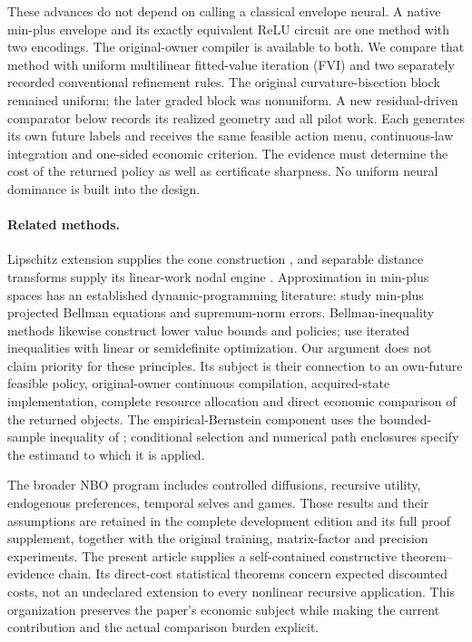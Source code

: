 \documentclass[ecta,nameyear,draft]{econsocart}
\begin{document}
These advances do not depend on calling a classical envelope neural. A native min-plus envelope and its exactly equivalent ReLU circuit are one method with two encodings. The original-owner compiler is available to both. We compare that method with uniform multilinear fitted-value iteration (FVI) and two separately recorded conventional refinement rules. The original curvature-bisection block remained uniform; the later graded block was nonuniform. A new residual-driven comparator below records its realized geometry and all pilot work. Each generates its own future labels and receives the same feasible action menu, continuous-law integration and one-sided economic criterion. The evidence must determine the cost of the returned policy as well as certificate sharpness. No uniform neural dominance is built into the design.

\paragraph{Related methods.}
Lipschitz extension supplies the cone construction \citep{mcshane1934}, and separable distance transforms supply its linear-work nodal engine \citep{felzenszwalb2012}. Approximation in min-plus spaces has an established dynamic-programming literature: \citet{lakshminarayanan2014} study min-plus projected Bellman equations and supremum-norm errors. Bellman-inequality methods likewise construct lower value bounds and policies; \citet{wang2015} use iterated inequalities with linear or semidefinite optimization. Our argument does not claim priority for these principles. Its subject is their connection to an own-future feasible policy, original-owner continuous compilation, acquired-state implementation, complete resource allocation and direct economic comparison of the returned objects. The empirical-Bernstein component uses the bounded-sample inequality of \citet{maurer2009}; conditional selection and numerical path enclosures specify the estimand to which it is applied.

The broader NBO program includes controlled diffusions, recursive utility, endogenous preferences, temporal selves and games. Those results and their assumptions are retained in the complete development edition and its full proof supplement, together with the original training, matrix-factor and precision experiments. The present article supplies a self-contained constructive theorem--evidence chain. Its direct-cost statistical theorems concern expected discounted costs, not an undeclared extension to every nonlinear recursive application. This organization preserves the paper's economic subject while making the current contribution and the actual comparison burden explicit.
\end{document}

